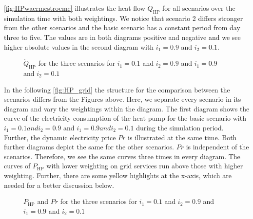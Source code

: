 \autoref{fig:HPwaermestroeme} illustrates the heat flow $\dot{Q}_\text{HP}$ for all scenarios over the simulation time with both weightings. We notice that scenario 2 differs stronger from the other scenarios and the basic scenario has a constant period from day three to five. The values are in both diagrams positive and negative and we see higher absolute values in the second diagram with $i_\text{1} = 0.9$ and $i_\text{2} = 0.1$.

    \begin{figure}[H]
           \centering
        \def\svgwidth{1.01\textwidth}
        
        \caption{$\dot{Q}_\text{HP}$ for the three scenarios for $i_\text{1} = 0.1$ and $i_\text{2} = 0.9$ and $i_\text{1} = 0.9$ and $i_\text{2} = 0.1$}
         \label{fig:HPwaermestroeme}
    \end{figure}
    
In the following \autoref{fig:HP_grid} the structure for the comparison between the scenarios differs from the Figures above. Here, we separate every scenario in its diagram and vary the weightings within the diagram. The first diagram shows the curve of the electricity consumption of the heat pump for the basic scenario with $i_\text{1} = 0.1 and i_\text{2} = 0.9$ and $i_\text{1} = 0.9 and i_\text{2} = 0.1$ during the simulation period. Further, the dynamic electricity price $Pr$ is illustrated at the same time. Both further diagrams depict the same for the other scenarios. $Pr$ is independent of the scenarios. Therefore, we see the same curves three times in every diagram. The curves of $P_\text{HP}$ with lower weighting on grid services run above those with higher weighting. Further, there are some yellow highlights at the x-axis, which are needed for a better discussion below. 
    \begin{figure}[H]
           \centering
        \def\svgwidth{0.9\textwidth}
        
        \caption{$P_\text{HP}$ and $Pr$ for the three scenarios for $i_\text{1} = 0.1$ and $i_\text{2} = 0.9$ and $i_\text{1} = 0.9$ and $i_\text{2} = 0.1$}
         \label{fig:HP_grid}
    \end{figure}
    

